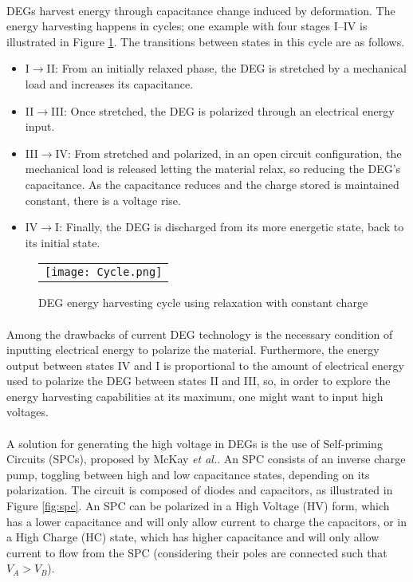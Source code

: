 \paragraph{} DEGs harvest energy through capacitance change induced by  deformation. The energy harvesting happens in cycles; one example with four stages I--IV is illustrated in Figure \ref{fig:cycle}. The transitions between states in this cycle are as follows.
\begin{itemize}
\item I$\rightarrow$II: From an initially relaxed phase, the DEG is stretched by a mechanical load and increases its capacitance.
\item II$\rightarrow$III: Once stretched, the DEG is polarized through an electrical energy input.
\item III$\rightarrow$IV: From stretched and polarized, in an open circuit configuration, the mechanical load is released letting the material relax, so reducing the DEG's capacitance. As the capacitance reduces and the charge stored is maintained constant, there is a voltage rise.
\item IV$\rightarrow$I: Finally, the DEG is discharged from its more energetic state, back to its initial state.
\end{itemize}

\begin{figure}[ht]
\begin{center}
\begin{tabular}{c}
\texttt{[image: Cycle.png]}
\end{tabular}
\end{center}
\caption 
{ \label{fig:cycle}
DEG energy harvesting cycle using relaxation with constant charge} 
\end{figure} 

\paragraph{} Among the drawbacks of current DEG technology is the necessary condition of inputting electrical energy to polarize the material. Furthermore, the energy output between states IV and I is proportional to the amount of electrical energy used to polarize the DEG between states II and III\cite{DEGCycles}, so, in order to explore the energy harvesting capabilities at its maximum, one might want to input high voltages.

\paragraph{} A solution for generating the high voltage in DEGs is the use of Self-priming Circuits (SPCs), proposed by McKay \textit{et al.}\cite{SPC2010}. An SPC consists of an inverse charge pump, toggling between high and low capacitance states, depending on its polarization. The circuit is composed of diodes and capacitors, as illustrated in Figure \ref{fig:spc}.  An SPC can be polarized in a High Voltage (HV) form, which has a lower capacitance and will only allow current to charge the capacitors, or in a High Charge (HC) state, which has higher capacitance and will only allow current to flow from the SPC (considering their poles are connected such that $V_A > V_B$).

